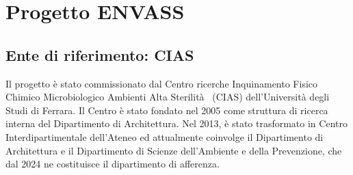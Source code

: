 \chapter{Progetto ENVASS}
\label{ch:envass}

\section{Ente di riferimento: CIAS}
Il progetto è stato commissionato dal Centro ricerche
Inquinamento Fisico Chimico Microbiologico Ambienti Alta Sterilità~\autocite{YourHealthOur} (CIAS)
dell'Università degli Studi di Ferrara. Il Centro è stato fondato nel 2005 come struttura di ricerca interna del Dipartimento di Architettura. Nel 2013, è stato trasformato in Centro Interdipartimentale dell'Ateneo ed attualmente coinvolge il Dipartimento di Architettura e il Dipartimento di Scienze dell’Ambiente e della Prevenzione, che dal 2024 ne costituisce il dipartimento di afferenza.

